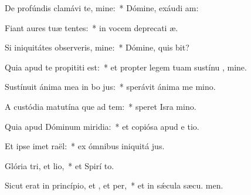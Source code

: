 \item De profúndis clamávi  te, mine:~* Dómine, exáudi  am:
\item Fiant aures tuæ tentes:~* in vocem deprecati æ.
\item Si iniquitátes observeris, mine:~* Dómine, quis bit?
\item Quia apud te propititi est:~* et propter legem tuam sustínu , mine.
\item Sustínuit ánima mea in bo jus:~* sperávit ánima me  mino.
\item A custódia matutína que ad tem:~* speret Isra  mino.
\item Quia apud Dóminum miridia:~* et copiósa apud e tio.
\item Et ipse imet raël:~* ex ómnibus iniquitá jus.
\item Glória tri, et lio,~* et Spirí to.
\item Sicut erat in princípio, et , et per,~* et in sǽcula sæcu. men.
